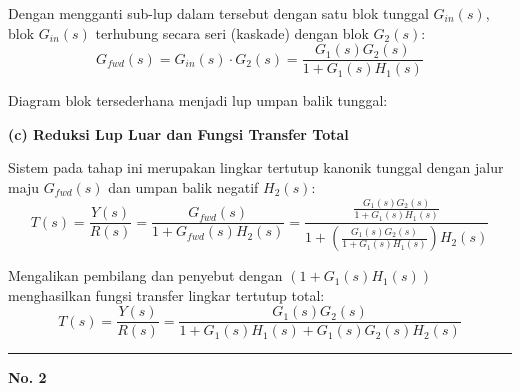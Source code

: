 \documentclass[11pt,a4paper]{article}
\begin{document}
Dengan mengganti sub-lup dalam tersebut dengan satu blok tunggal $G_{in}(s)$, blok $G_{in}(s)$ terhubung secara seri (kaskade) dengan blok $G_2(s)$:
$$G_{fwd}(s) = G_{in}(s) \cdot G_2(s) = \frac{G_1(s) G_2(s)}{1 + G_1(s) H_1(s)}$$

Diagram blok tersederhana menjadi lup umpan balik tunggal:

\begin{center}
\end{center}

\textbf{(c) Reduksi Lup Luar dan Fungsi Transfer Total}

Sistem pada tahap ini merupakan lingkar tertutup kanonik tunggal dengan jalur maju $G_{fwd}(s)$ dan umpan balik negatif $H_2(s)$:
$$T(s) = \frac{Y(s)}{R(s)} = \frac{G_{fwd}(s)}{1 + G_{fwd}(s) H_2(s)} = \frac{\frac{G_1(s) G_2(s)}{1 + G_1(s) H_1(s)}}{1 + \left( \frac{G_1(s) G_2(s)}{1 + G_1(s) H_1(s)} \right) H_2(s)}$$

Mengalikan pembilang dan penyebut dengan $(1 + G_1(s) H_1(s))$ menghasilkan fungsi transfer lingkar tertutup total:
$$T(s) = \frac{Y(s)}{R(s)} = \frac{G_1(s) G_2(s)}{1 + G_1(s) H_1(s) + G_1(s) G_2(s) H_2(s)}$$

\vspace{12pt}
\hrule
\vspace{10pt}

\textbf{\large No. 2}
\end{document}
